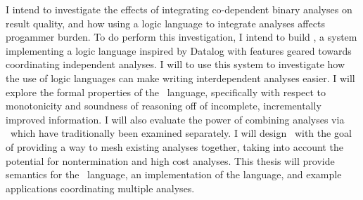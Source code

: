 {\fontsize{10}{12}\selectfont
I intend to investigate the effects of integrating co-dependent binary analyses on result quality, and how using a logic language to integrate analyses affects progammer burden.
To do perform this investigation, I intend to build \sysname, a system implementing a logic language inspired by Datalog with features geared towards coordinating independent analyses.
I will to use this system to investigate how the use of logic languages can make writing interdependent analyses easier.
I will explore the formal properties of the \sysname\ language, specifically with respect to monotonicity and soundness of reasoning off of incomplete, incrementally improved information.
I will also evaluate the power of combining analyses via \sysname\ which have traditionally been examined separately.
I will design \sysname\ with the goal of providing a way to mesh existing analyses together, taking into account the potential for nontermination and high cost analyses.
This thesis will provide semantics for the \sysname\ language, an implementation of the language, and example applications coordinating multiple analyses.
}
